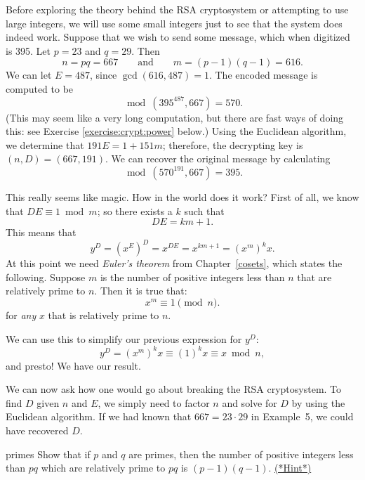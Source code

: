 \vspace{2 ex}
 
\begin{example}{}
Before exploring the theory behind the RSA cryptosystem or attempting
to use large integers, we will use some small integers just to see
that the system does indeed work. Suppose that we wish to send some
message, which when digitized is 395. Let $p = 23$ and $q = 29$.  Then 
$$ n = pq = 667 \qquad \textrm{and} \qquad
m = (p - 1)(q - 1) = 616.
$$
We can let $E = 487$, since $\gcd(616, 487) = 1$. The encoded message
is computed to be  
$$
\bmod(395^{487},  667) = 570.
$$
(This may seem like a very long computation, but there are fast ways of doing this: see Exercise \ref{exercise:crypt:power} below.)
Using the Euclidean
algorithm, we determine that $191 E = 1 + 151 m$; therefore, the
decrypting key is $(n, D) = ( 667, 191)$. We can recover the original 
message by calculating  
$$
 \bmod(570^{191}, 667) = 395.
$$
\end{example}
 
 
\vspace{ 2 ex}
 
 
This really seems like magic. How in the world does it work? 
First of all, we know that $DE
\equiv 1 \bmod{ m}$; so there exists a $k$ such that 
$$
DE = km + 1.
$$
This means that
$$
y^D = (x^E)^D = x^{DE} = x^{km+1} = (x^m)^k x.
$$
At this point we need \emph{Euler's theorem} from Chapter~\ref{cosets}, which states the following. Suppose $m$ is the number of positive integers less than $n$ that are relatively prime to $n$. Then it is true that:
$$
x^m \equiv 1 \pmod n.
$$
for \emph{any} $x$ that is relatively prime to $n$. 

We can use this to simplify our previous expression for $y^D$:
$$
y^D =  (x^m)^k x \equiv (1)^k x  \equiv x \bmod n,
$$
 and presto! We have our result.
 
We can now ask how one would go about breaking the RSA cryptosystem.
To find $D$ given $n$ and $E$, we simply need to factor $n$ and solve
for $D$ by using the Euclidean algorithm. If we had known that $667 =
23 \cdot 29$ in Example~5, we could have recovered $D$.    
 
 
 
\begin{exercise}{primes}
Show that if $p$ and $q$ are primes, then the number of positive integers less than $pq$ which are relatively prime to $pq$ is $(p-1)(q-1)$.
\hyperref[sec:crypt:hints]{(*Hint*)}
\end{exercise}
 
